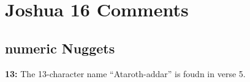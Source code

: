 \section{Joshua 16 Comments}

\subsection{numeric Nuggets}
\textbf{13: } The 13-character name ``Ataroth-addar'' is foudn in verse 5.